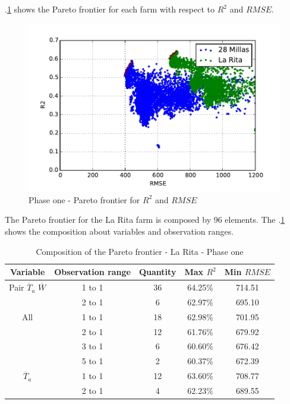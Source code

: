 \documentclass[review]{elsarticle}
\begin{document}
\figurename $.$\ref{figura7} shows the Pareto frontier for each farm with respect to $R^2$ and $RMSE$. 

\begin{figure}[H] 
 \centering
 \includegraphics[scale=.8]{Phase_one_R2_RMSE}
 \caption{Phase one - Pareto frontier for $R^2$ and $RMSE$} 
 \label{figura7} 
\end{figure}

The Pareto frontier for the La Rita farm is composed by 96 elements. The \tablename $.$\ref{tabla2} shows the composition about variables and observation ranges.

\begin{table}[h] 
\caption{Composition of the Pareto frontier - La Rita - Phase one} 
\label{tabla2} 
\centering
\begin{tabular}{c|c|c|c|c} 
\hline
\bfseries Variable & \bfseries Observation range & \bfseries Quantity & \bfseries Max $R^2$ & \bfseries Min $RMSE$\\ 
\hline\hline 
Pair $\overline{T}_{a}$ $\overline{W}$ &	1 to 1  & 36 & 64.25\% & 714.51 \\
 &	2 to 1  & 6 & 62.97\% & 695.10 \\
\hline 
All  & 1 to 1  & 18 & 62.98\% & 701.95 \\
   & 2 to 1  & 12 & 61.76\% & 679.92 \\
    & 3 to 1  & 6 & 60.60\% & 676.42 \\
    & 5 to 1  &  2 & 60.37\% & 672.39 \\
\hline    
$\overline{T}_{a}$ & 1 to 1  & 12  & 63.60\% & 708.77 \\
       &	2 to 1  & 4 & 62.23\% & 689.55 \\
\hline
\end{tabular} 
\end{table}
\end{document}
